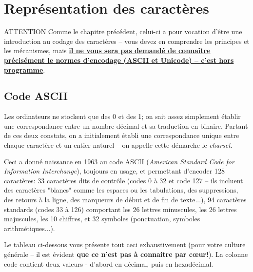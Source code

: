 \documentclass[12pt]{article}
\begin{document}
	\pagebreak
	
	\section{Représentation des caractères}
	
	\begin{MonAmp}{ATTENTION}
		Comme le chapitre précédent, celui-ci a pour vocation d'être une introduction au codage des caractères -- vous devez en comprendre les principes et les mécanismes, mais \textbf{\uline{il ne vous sera pas demandé de connaître précisément le normes d'encodage (ASCII et Unicode) -- c'est hors programme}}. 	\end{MonAmp}
	
	\subsection{Code ASCII}
	
	Les ordinateurs ne stockent que des 0 et des 1; on sait assez simplement établir une correspondance entre un nombre décimal et sa traduction en binaire. Partant de ces deux constats, on a initialement établi une correspondance unique entre chaque caractère et un entier naturel -- on appelle cette démarche le \textit{charset}.
	
	Ceci a donné naissance en 1963 au code ASCII (\textit{American Standard Code for Information Interchange}), toujours en usage, et permettant d'encoder 128 caractères: 33 caractères dits de contrôle (codes 0 à 32 et code 127 -- ils incluent des caractères "blancs" comme les espaces ou les tabulations, des suppressions, des retours à la ligne, des marqueurs de début et de fin de texte...), 94 caractères standards (codes 33 à 126) comportant les 26 lettres minuscules, les 26 lettres majuscules, les 10 chiffres, et 32 symboles (ponctuation, symboles arithmétiques...).
	
	Le tableau ci-dessous vous présente tout ceci exhaustivement (pour votre culture générale -- il est évident \textbf{que ce n'est pas à connaitre par cœur!}). La colonne code contient deux valeurs - d'abord en décimal, puis en hexadécimal.
	
\end{document}
